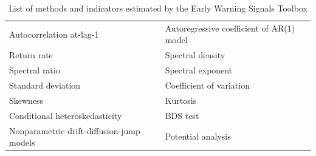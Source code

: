 \documentclass[12pt,a4paper,final]{article}
\begin{document}
\begin{table}[h]
\centering
\caption{List of methods and indicators estimated by the Early Warning Signals Toolbox}%
\begin{tabular}{l l}%
\hline
\hline
Autocorrelation at-lag-1 &	%
Autoregressive coefficient of AR(1) model	\\ %
Return rate &	%
Spectral density \\%
Spectral ratio &	%
Spectral exponent\\	%
Standard deviation &	%
Coefficient of variation\\	%
Skewness &	%
Kurtosis	\\%
Conditional heteroskedasticity	&%
BDS test	\\%
Nonparametric drift-diffusion-jump models	&%
Potential analysis	\\ [0.5ex]%
\hline
\hline
\end{tabular}
\label{methods_table}
\end{table}%
\end{document}
